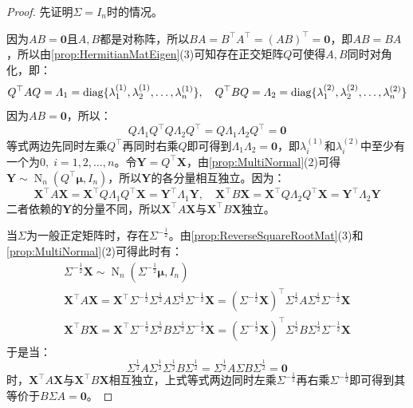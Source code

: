 \begin{proof}
	先证明$\Sigma=I_n$时的情况。\par
	因为$AB=\mathbf{0}$且$A,B$都是对称阵，所以$BA=B^{\top}A^{\top}=(AB)^{\top}=\mathbf{0}$，即$AB=BA$，所以由\cref{prop:HermitianMatEigen}(3)可知存在正交矩阵$Q$可使得$A,B$同时对角化，即：
	\begin{equation*}
		Q^{\top}AQ=\varLambda_1=\operatorname{diag}\{\lambda^{(1)}_1, \lambda^{(1)}_2, \dots, \lambda^{(1)}_{n}\},\quad Q^{\top}BQ=\varLambda_2=\operatorname{diag}\{\lambda^{(2)}_1, \lambda^{(2)}_2, \dots, \lambda^{(2)}_{n}\}
	\end{equation*}
	因为$AB=\mathbf{0}$，所以：
	\begin{equation*}
		Q\varLambda_1Q^{\top}Q\varLambda_2Q^{\top}=Q\varLambda_1\varLambda_2Q^{\top}=\mathbf{0}
	\end{equation*}
	等式两边先同时左乘$Q^{\top}$再同时右乘$Q$即可得到$\varLambda_1\varLambda_2=\mathbf{0}$，即$\lambda_i^{(1)}$和$\lambda_i^{(2)}$中至少有一个为$0,\;i=1,2,\dots,n$。令$\mathbf{Y}=Q^{\top}\mathbf{X}$，由\cref{prop:MultiNormal}(2)可得$\mathbf{Y}\sim\operatorname{N}_n(Q^{\top}\boldsymbol{\mu},I_n)$，所以$\mathbf{Y}$的各分量相互独立。因为：
	\begin{equation*}
		\mathbf{X}^{\top}A\mathbf{X}=\mathbf{X}^{\top}Q\varLambda_1Q^{\top}\mathbf{X}=\mathbf{Y}^{\top}\varLambda_1\mathbf{Y},\quad\mathbf{X}^{\top}B\mathbf{X}=\mathbf{X}^{\top}Q\varLambda_2Q^{\top}\mathbf{X}=\mathbf{Y}^{\top}\varLambda_2\mathbf{Y}
	\end{equation*}
	二者依赖的$\mathbf{Y}$的分量不同，所以$\mathbf{X}^{\top}A\mathbf{X}$与$\mathbf{X}^{\top}B\mathbf{X}$独立。\par
	当$\Sigma$为一般正定矩阵时，存在$\Sigma^{-\frac{1}{2}}$。由\cref{prop:ReverseSquareRootMat}(3)和\cref{prop:MultiNormal}(2)可得此时有：
	\begin{gather*}
		\Sigma^{-\frac{1}{2}}\mathbf{X}\sim\operatorname{N}_n(\Sigma^{-\frac{1}{2}}\boldsymbol{\mu},I_n) \\
		\mathbf{X}^{\top}A\mathbf{X}=\mathbf{X}^{\top}\Sigma^{-\frac{1}{2}}\Sigma^{\frac{1}{2}}A\Sigma^{\frac{1}{2}}\Sigma^{-\frac{1}{2}}\mathbf{X}=(\Sigma^{-\frac{1}{2}}\mathbf{X})^{\top}\Sigma^{\frac{1}{2}}A\Sigma^{\frac{1}{2}}\Sigma^{-\frac{1}{2}}\mathbf{X} \\
		\mathbf{X}^{\top}B\mathbf{X}=\mathbf{X}^{\top}\Sigma^{-\frac{1}{2}}\Sigma^{\frac{1}{2}}B\Sigma^{\frac{1}{2}}\Sigma^{-\frac{1}{2}}\mathbf{X}=(\Sigma^{-\frac{1}{2}}\mathbf{X})^{\top}\Sigma^{\frac{1}{2}}B\Sigma^{\frac{1}{2}}\Sigma^{-\frac{1}{2}}\mathbf{X}
	\end{gather*}
	于是当：
	\begin{equation*}
		\Sigma^{\frac{1}{2}}A\Sigma^{\frac{1}{2}}\Sigma^{\frac{1}{2}}B\Sigma^{\frac{1}{2}}=\Sigma^{\frac{1}{2}}A\Sigma B\Sigma^{\frac{1}{2}}=\mathbf{0}
	\end{equation*}
	时，$\mathbf{X}^{\top}A\mathbf{X}$与$\mathbf{X}^{\top}B\mathbf{X}$相互独立，上式等式两边同时左乘$\Sigma^{-\frac{1}{2}}$再右乘$\Sigma^{-\frac{1}{2}}$即可得到其等价于$B\Sigma A=\mathbf{0}$。
\end{proof}


